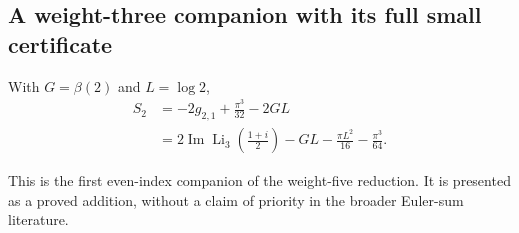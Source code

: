 \subsection{A weight-three companion with its full small certificate}

\begin{theorem}\label{s2proof:thm:S2}
With $G=\beta(2)$ and $L=\log2$,
\begin{align*}
 S_2&=-2g_{2,1}+\frac{\pi^3}{32}-2GL\\
 &=2\operatorname{Im}\operatorname{Li}_3\!\left(\frac{1+i}{2}\right)
 -GL-\frac{\pi L^2}{16}-\frac{\pi^3}{64}.
\end{align*}
\end{theorem}

This is the first even-index companion of the weight-five reduction.  It is presented
as a proved addition, without a claim of priority in the broader
Euler-sum literature.

